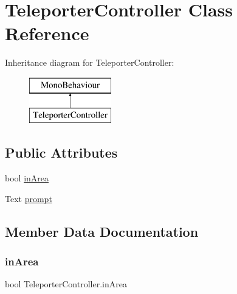 \hypertarget{class_teleporter_controller}{}\section{Teleporter\+Controller Class Reference}
\label{class_teleporter_controller}
Inheritance diagram for Teleporter\+Controller\+:\begin{figure}[H]
\begin{center}
\leavevmode
\includegraphics[height=2.000000cm]{class_teleporter_controller}
\end{center}
\end{figure}
\subsection*{Public Attributes}
\begin{DoxyCompactItemize}
\item 
bool \hyperlink{class_teleporter_controller_a8b0e6351deab4d1a6f3ed8a83e21c4d0}{in\+Area}
\item 
Text \hyperlink{class_teleporter_controller_ac2f90747d04873f5c07a2814fc5f3b56}{prompt}
\end{DoxyCompactItemize}


\subsection{Member Data Documentation}
\mbox{\label{class_teleporter_controller_a8b0e6351deab4d1a6f3ed8a83e21c4d0}} 
\subsubsection{\texorpdfstring{in\+Area}{inArea}}
{\footnotesize\ttfamily bool Teleporter\+Controller.\+in\+Area}

\mbox{\label{class_teleporter_controller_ac2f90747d04873f5c07a2814fc5f3b56}} 
